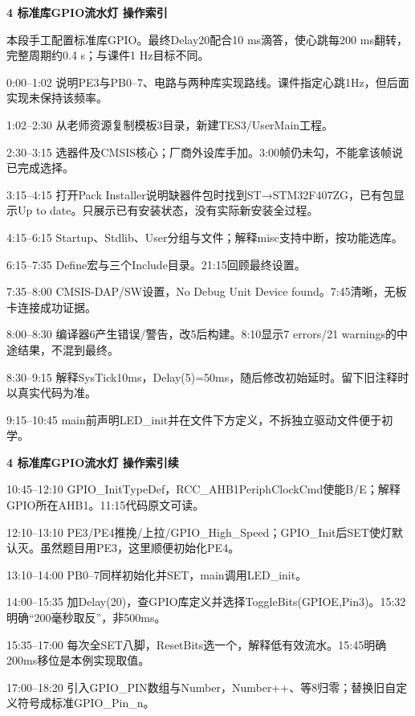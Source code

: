 \documentclass[10pt,a4paper]{article}
\newcommand{\qtitle}[1]{{\Large\bfseries #1}\par\vspace{4pt}}
\begin{document}
\clearpage
{}
\qtitle{4 标准库GPIO流水灯 操作索引}
本段手工配置标准库GPIO。最终Delay20配合10 ms滴答，使心跳每200 ms翻转，完整周期约0.4 s；与课件1 Hz目标不同。

0:00–1:02  说明PE3与PB0–7、电路与两种库实现路线。课件指定心跳1Hz，但后面实现未保持该频率。

1:02–2:30  从老师资源复制模板3目录，新建TES3/\allowbreak{}UserMain工程。

2:30–3:15  选器件及CMSIS核心；厂商外设库手加。3:00帧仍未勾，不能拿该帧说已完成选择。

3:15–4:15  打开Pack Installer说明缺器件包时找到ST→STM32F407ZG，已有包显示Up to date。只展示已有安装状态，没有实际新安装全过程。

4:15–6:15  Startup、Stdlib、User分组与文件；解释misc支持中断，按功能选库。

6:15–7:35  Define宏与三个Include目录。21:15回顾最终设置。

7:35–8:00  CMSIS-DAP/\allowbreak{}SW设置，No Debug Unit Device found。7:45清晰，无板卡连接成功证据。

8:00–8:30  编译器6产生错误/\allowbreak{}警告，改5后构建。8:10显示7 errors/\allowbreak{}21 warnings的中途结果，不混到最终。

8:30–9:15  解释SysTick10ms，Delay(5)=50ms，随后修改初始延时。留下旧注释时以真实代码为准。

9:15–10:45  main前声明LED\_\allowbreak{}init并在文件下方定义，不拆独立驱动文件便于初学。


\clearpage
{}
\qtitle{4 标准库GPIO流水灯 操作索引续}
10:45–12:10  GPIO\_\allowbreak{}InitTypeDef，RCC\_\allowbreak{}AHB1PeriphClockCmd使能B/\allowbreak{}E；解释GPIO所在AHB1。11:15代码原文可读。

12:10–13:10  PE3/\allowbreak{}PE4推挽/\allowbreak{}上拉/\allowbreak{}GPIO\_\allowbreak{}High\_\allowbreak{}Speed；GPIO\_\allowbreak{}Init后SET使灯默认灭。虽然题目用PE3，这里顺便初始化PE4。

13:10–14:00  PB0–7同样初始化并SET，main调用LED\_\allowbreak{}init。

14:00–15:35  加Delay(20)，查GPIO库定义并选择ToggleBits(GPIOE,Pin3)。15:32明确“200毫秒取反”，非500ms。

15:35–17:00  每次全SET八脚，ResetBits选一个，解释低有效流水。15:45明确200ms移位是本例实现取值。

17:00–18:20  引入GPIO\_\allowbreak{}PIN数组与Number，Number++、等8归零；替换旧自定义符号成标准GPIO\_\allowbreak{}Pin\_\allowbreak{}n。
\end{document}
